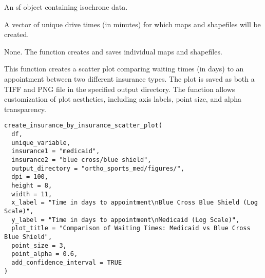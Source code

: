 \documentclass[a4paper]{book}
\begin{document}
%
\begin{Arguments}
\begin{ldescription}
\item[\code{isochrones}] An sf object containing isochrone data.

\item[\code{drive\_times}] A vector of unique drive times (in minutes) for which maps and shapefiles will be created.
\end{ldescription}
\end{Arguments}
%
\begin{Value}
None. The function creates and saves individual maps and shapefiles.
\end{Value}
%
\begin{Examples}
\end{Examples}
%
\begin{Description}
This function creates a scatter plot comparing waiting times (in days) to an appointment between two different insurance types.
The plot is saved as both a TIFF and PNG file in the specified output directory. The function allows customization of plot aesthetics,
including axis labels, point size, and alpha transparency.
\end{Description}
%
\begin{Usage}
\begin{verbatim}
create_insurance_by_insurance_scatter_plot(
  df,
  unique_variable,
  insurance1 = "medicaid",
  insurance2 = "blue cross/blue shield",
  output_directory = "ortho_sports_med/figures/",
  dpi = 100,
  height = 8,
  width = 11,
  x_label = "Time in days to appointment\nBlue Cross Blue Shield (Log Scale)",
  y_label = "Time in days to appointment\nMedicaid (Log Scale)",
  plot_title = "Comparison of Waiting Times: Medicaid vs Blue Cross Blue Shield",
  point_size = 3,
  point_alpha = 0.6,
  add_confidence_interval = TRUE
)
\end{verbatim}
\end{Usage}
\end{document}
